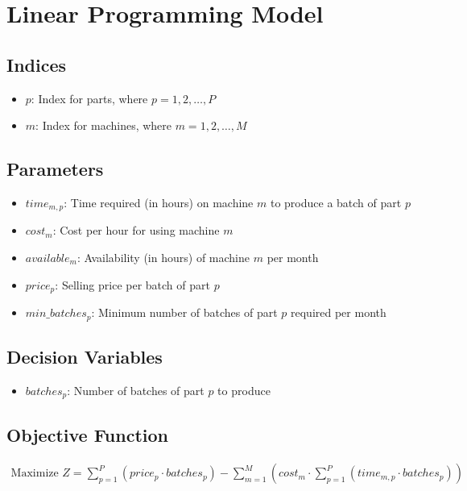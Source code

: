 \documentclass{article}
\begin{document}
\section*{Linear Programming Model}

\subsection*{Indices}
\begin{itemize}
    \item \( p \): Index for parts, where \( p = 1, 2, \ldots, P \)
    \item \( m \): Index for machines, where \( m = 1, 2, \ldots, M \)
\end{itemize}

\subsection*{Parameters}
\begin{itemize}
    \item \( time_{m,p} \): Time required (in hours) on machine \( m \) to produce a batch of part \( p \)
    \item \( cost_{m} \): Cost per hour for using machine \( m \)
    \item \( available_{m} \): Availability (in hours) of machine \( m \) per month
    \item \( price_{p} \): Selling price per batch of part \( p \)
    \item \( min\_batches_{p} \): Minimum number of batches of part \( p \) required per month
\end{itemize}

\subsection*{Decision Variables}
\begin{itemize}
    \item \( batches_{p} \): Number of batches of part \( p \) to produce
\end{itemize}

\subsection*{Objective Function}
\begin{align*}
    \text{Maximize } Z = \sum_{p=1}^{P} (price_{p} \cdot batches_{p}) - \sum_{m=1}^{M} (cost_{m} \cdot \sum_{p=1}^{P} (time_{m,p} \cdot batches_{p}))
\end{align*}
\end{document}
